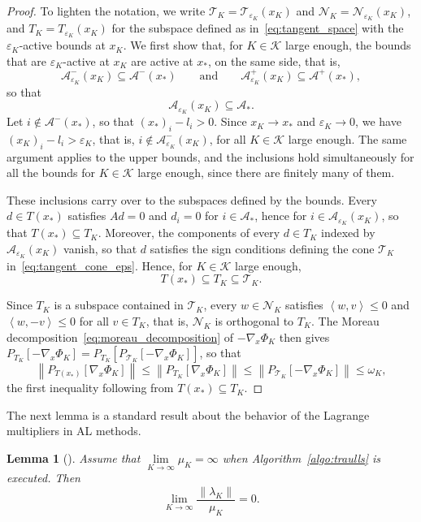 \documentclass[pdflatex,sn-mathphys-num]{sn-jnl}%
\theoremstyle{thmstyleone}%
\newtheorem{lemma}[theorem]{Lemma}
\newcommand{\calA}{{\mathcal{A}}}
\newcommand{\calK}{{\mathcal{K}}}
\newcommand{\calN}{{\mathcal{N}}}
\newcommand{\calT}{{\mathcal{T}}}
\newcommand{\inner}[2]{\left\langle {#1} , {#2} \right\rangle} %
\newcommand{\proj}[2]{P_{#1} \left[ {#2} \right]} %
\begin{document}
\begin{proof}
	To lighten the notation, we write $\calT_K = \calT_{\varepsilon_K}(x_K)$ and $\calN_K = \calN_{\varepsilon_K}(x_K)$, and $T_K = T_{\varepsilon_K}(x_K)$ for the subspace defined as in~\eqref{eq:tangent_space} with the $\varepsilon_K$-active bounds at $x_K$. We first show that, for $K \in \calK$ large enough, the bounds that are $\varepsilon_K$-active at $x_K$ are active at $x_*$, on the same side, that is,
	\[\calA^-_{\varepsilon_K}(x_K) \subseteq \calA^-(x_*) \qquad \text{and} \qquad \calA^+_{\varepsilon_K}(x_K) \subseteq \calA^+(x_*),\]
	so that 
	\[\calA_{\varepsilon_K}(x_K) \subseteq \calA_*.\]
	Let $i \notin \calA^-(x_*)$, so that $(x_*)_i - l_i > 0$. Since $x_K \to x_*$ and $\varepsilon_K \to 0$, we have $(x_K)_i - l_i > \varepsilon_K$, that is, $i \notin \calA^-_{\varepsilon_K}(x_K)$, for all $K \in \calK$ large enough. The same argument applies to the upper bounds, and the inclusions hold simultaneously for all the bounds for $K \in \calK$ large enough, since there are finitely many of them.

	These inclusions carry over to the subspaces defined by the bounds. Every $d \in T(x_*)$ satisfies $Ad = 0$ and $d_i = 0$ for $i \in \calA_*$, hence for $i \in \calA_{\varepsilon_K}(x_K)$, so that $T(x_*) \subseteq T_K$. Moreover, the components of every $d \in T_K$ indexed by $\calA_{\varepsilon_K}(x_K)$ vanish, so that $d$ satisfies the sign conditions defining the cone $\calT_K$ in~\eqref{eq:tangent_cone_eps}. Hence, for $K \in \calK$ large enough,
	\[T(x_*) \subseteq T_K \subseteq \calT_K.\]

	Since $T_K$ is a subspace contained in $\calT_K$, every $w \in \calN_K$ satisfies $\inner{w}{v} \le 0$ and $\inner{w}{-v} \le 0$ for all $v \in T_K$, that is, $\calN_K$ is orthogonal to $T_K$. The Moreau decomposition~\eqref{eq:moreau_decomposition} of $-\nabla_x\Phi_K$ then gives $\proj{T_K}{-\nabla_x\Phi_K} = \proj{T_K}{\proj{\calT_K}{-\nabla_x\Phi_K}}$, so that
	\begin{equation*}
		\left\| \proj{T(x_*)}{\nabla_x \Phi_K} \right\| \le \left\| \proj{T_K}{\nabla_x \Phi_K} \right\| \le \left\| \proj{\calT_K}{-\nabla_x \Phi_K} \right\| \le \omega_K,
	\end{equation*}
	the first inequality following from $T(x_*) \subseteq T_K$.
\end{proof}

The next lemma is a standard result about the behavior of the Lagrange multipliers in AL methods.
\begin{lemma}[{\cite[Lemma~14.4.1]{conn-etal:2000}}]\label{lemma:behavior_multipliers}
	Assume that $\lim\limits_{K\to \infty} \mu_K = \infty$ when Algorithm~\ref{algo:traulls} is executed. Then 
	\begin{equation*}
		\lim\limits_{K\to \infty} \frac{\|\lambda_K\|}{\mu_K} = 0.
	\end{equation*}
\end{lemma}
\end{document}
